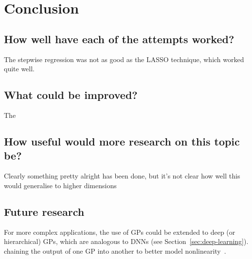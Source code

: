 
\chapter{Conclusion}

\section{How well have each of the attempts worked?}

\begin{todo}
    The stepwise regression was not as good as the LASSO technique, which worked quite well.
\end{todo}

\section{What could be improved?}

\begin{todo}
    The 
\end{todo}

\section{How useful would more research on this topic be?}

\begin{todo}
    Clearly something pretty alright has been done, but it's not clear how well this would generalise to higher dimensions
\end{todo}

\section{Future research}

For more complex applications, the use of \acp{GP} could be extended to deep (or hierarchical) \acp{GP}, which are analogous to \acp{DNN} (see Section~\ref{sec:deep-learning}).
 chaining the output of one \ac{GP} into another to better model nonlinearity~\autocite{damianou2013}.
